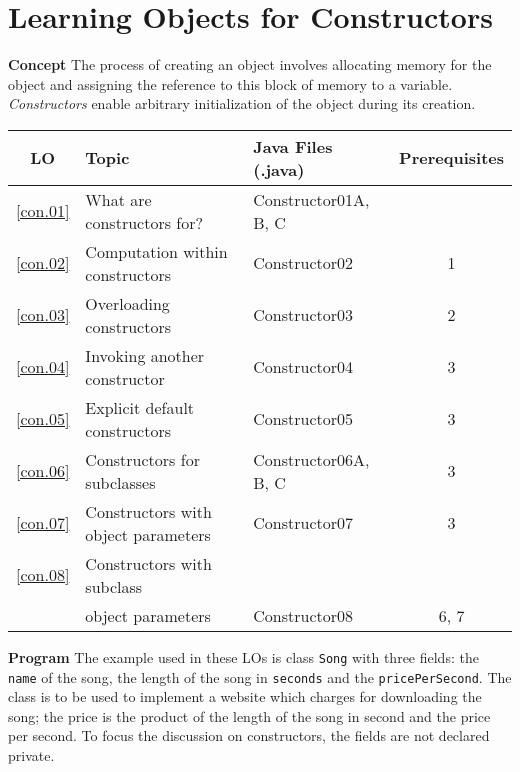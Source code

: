\section{Learning Objects for Constructors}\label{s.constructors}

\textbf{Concept} The process of creating an object involves allocating memory for the object and assigning the reference to this block of memory to a variable. \emph{Constructors} enable arbitrary initialization of the object during its creation. 

\begin{center}
\begin{tabular}{|c|l|l|c|}
\hline
LO & Topic  & Java Files (.java) & Prerequisites \\\hline
\ref{con.01} &  What are constructors for? & Constructor01A, B, C &\\\hline
\ref{con.02} &  Computation within constructors &  Constructor02  & 1\\\hline
\ref{con.03} &  Overloading constructors  &  Constructor03 &  2\\\hline
\ref{con.04} &  Invoking another constructor &    Constructor04 &  3\\\hline
\ref{con.05} &  Explicit default constructors &    Constructor05 &  3\\\hline
\ref{con.06} &  Constructors for subclasses & Constructor06A, B, C &   3\\\hline
\ref{con.07} &  Constructors with object parameters & Constructor07  & 3\\\hline
\ref{con.08} &  Constructors with subclass& & \\
  & object parameters  & Constructor08 &  6, 7\\\hline
\end{tabular}
\end{center}

\textbf{Program} The example used in these LOs is class \texttt{Song} with three fields: the \texttt{name} of the song, the length of the song in \texttt{seconds} and the \texttt{pricePerSecond}. The class is to be used to implement a website which charges for downloading the song; the price is the product of the length of the song in second and the price per second. To focus the discussion on constructors, the fields are not declared private.









